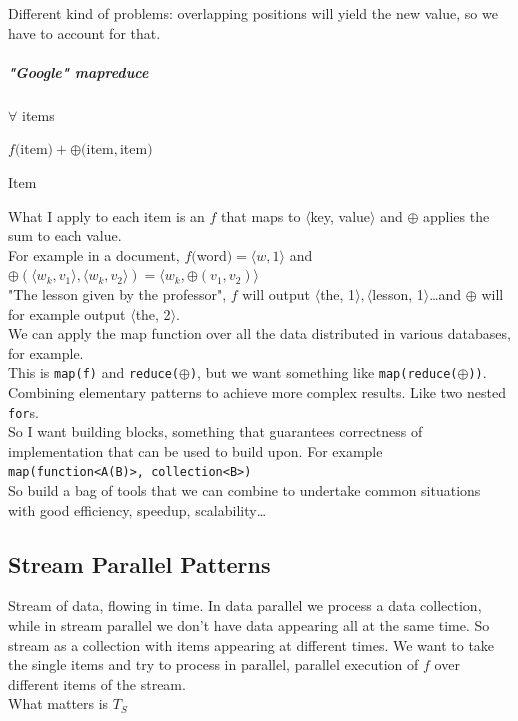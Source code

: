 \documentclass[10pt]{report}
\begin{document}
Different kind of problems: overlapping positions will yield the new value, so we have to account for that.
\subparagraph{"Google" mapreduce}
\begin{list}{}{}
	\item $\forall$ items
	\item $f($item$) + \oplus($item$, $item$)$
	\item Item
\end{list}
What I apply to each item is an $f$ that maps to $\langle$key, value$\rangle$ and $\oplus$ applies the sum to each value.\\
For example in a document, $f($word$)=\langle w,1\rangle$ and $\oplus(\langle w_k,v_1\rangle,\langle w_k,v_2\rangle) = \langle w_k, \oplus(v_1,v_2)\rangle$\\
"The lesson given by the professor", $f$ will output $\langle$the, 1$\rangle,\langle$lesson, 1$\rangle$\ldots and $\oplus$ will for example output $\langle$the, 2$\rangle$.\\
We can apply the map function over all the data distributed in various databases, for example.\\
This is \texttt{map(f)} and \texttt{reduce($\oplus$)}, but we want something like \texttt{map(reduce($\oplus$))}. Combining elementary patterns to achieve more complex results. Like two nested \texttt{for}s.\\
So I want building blocks, something that guarantees correctness of implementation that can be used to build upon. For example \texttt{map(function<A(B)>, collection<B>)}\\
So build a bag of tools that we can combine to undertake common situations with good efficiency, speedup, scalability\ldots
\subsection{Stream Parallel Patterns}
Stream of data, flowing in time. In data parallel we process a data collection, while in stream parallel we don't have data appearing all at the same time. So stream as a collection with items appearing at different times. We want to take the single items and try to process in parallel, parallel execution of $f$ over different items of the stream.\\
What matters is $T_S$
\end{document}
